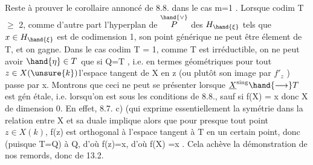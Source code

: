 Reste à prouver le corollaire annoncé de 8.8. dans le cas m=1 .
Lorsque  codim T $\geqslant$ 2, comme d'autre part l'hyperplan  de $\overset{\hand{\vee}}{P}$ des
$H_{\hand{\xi}}$ tels que $x\in H_{\hand{\xi}}$ est de codimension 1, son point générique  ne peut
être élement de T, et on gagne. Dans le cas codim T = 1, comme T est
irréductible, on ne peut avoir $\hand{\eta}\in T$ que si Q=T ,
i.e. en termes géométriques   pour tout $z\in X(\unsure{k})$l'espace tangent
de X en z (ou plutôt son image par $f'_{z}$ ) passe par x. Montrons que
ceci ne peut se présenter lorsque $\underline{X}^{\mathrm{sing}}\hand{\longrightarrow}T$ est gén étale, i.e.
lorsqu'on est sous les conditions de 8.8., sauf si f(X) = \hand{\{}x\hand{\}} donc X
de dimension 0. En effet, 8.7. c) (qui exprime essentiellement la
symétrie  dans la relation entre X et sa duale \hand{)} implique alors que
pour presque tout point $z\in X(k)$, f(z) est orthogonal à l'espace tangent
à T en un certain point, donc (puisque T=Q)  à Q, d'où f(z)=x, d'où
f(X) =\hand{\{}x\hand{\}} . Cela achève la démonstration de nos remords, donc de 13.2.

